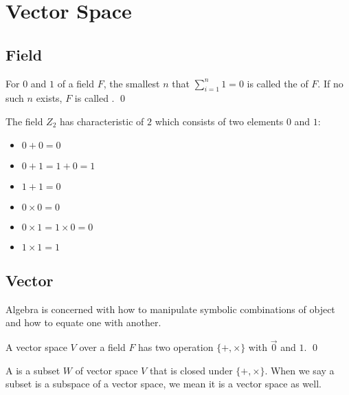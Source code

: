 \section{Vector Space}

\subsection{Field}

\begin{definition}
    For $0$ and $1$ of a field $F$, the smallest $n$ that $\displaystyle \sum_{i=1}^n 1 = 0$ is called the  of $F$. If no such $n$ exists, $F$ is called .
    \qed
\end{definition}

\begin{definition}
    The field $Z_2$ has characteristic of $2$ which consists of two elements $0$ and $1$:
    \begin{itemize}
        \item $0 + 0 = 0$
        \item $0 + 1 = 1 + 0 = 1$
        \item $1 + 1 = 0$
        \item $0 \times 0 = 0$
        \item $0 \times 1 = 1 \times 0 = 0$
        \item $1 \times 1 = 1$
    \end{itemize}
\end{definition}

\subsection{Vector}

Algebra is concerned with how to manipulate symbolic combinations of object and how to equate one with another.

\begin{definition}
A  vector space $V$ over a  field $F$ has two operation $\{+,\times\}$ with $\vec{0}$ and $1$. \qed
\end{definition}



\begin{definition}
	A  is a subset $W$ of vector space $V$ that is closed under $\{+,\times\}$. When we say a subset is a subspace of a vector space, we mean it is a vector space as well.
\end{definition}

